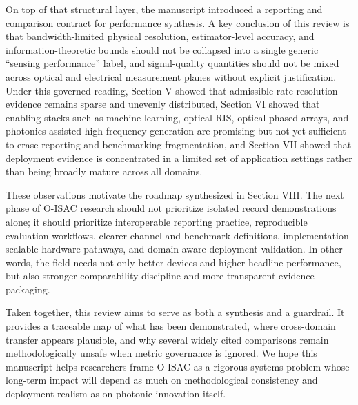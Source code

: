 \documentclass[lettersize,journal]{IEEEtran}
\begin{document}
On top of that structural layer, the manuscript introduced a reporting and comparison contract for performance synthesis. A key conclusion of this review is that bandwidth-limited physical resolution, estimator-level accuracy, and information-theoretic bounds should not be collapsed into a single generic ``sensing performance'' label, and signal-quality quantities should not be mixed across optical and electrical measurement planes without explicit justification. Under this governed reading, Section V showed that admissible rate-resolution evidence remains sparse and unevenly distributed, Section VI showed that enabling stacks such as machine learning, optical RIS, optical phased arrays, and photonics-assisted high-frequency generation are promising but not yet sufficient to erase reporting and benchmarking fragmentation, and Section VII showed that deployment evidence is concentrated in a limited set of application settings rather than being broadly mature across all domains.

These observations motivate the roadmap synthesized in Section VIII. The next phase of O-ISAC research should not prioritize isolated record demonstrations alone; it should prioritize interoperable reporting practice, reproducible evaluation workflows, clearer channel and benchmark definitions, implementation-scalable hardware pathways, and domain-aware deployment validation. In other words, the field needs not only better devices and higher headline performance, but also stronger comparability discipline and more transparent evidence packaging.

Taken together, this review aims to serve as both a synthesis and a guardrail. It provides a traceable map of what has been demonstrated, where cross-domain transfer appears plausible, and why several widely cited comparisons remain methodologically unsafe when metric governance is ignored. We hope this manuscript helps researchers frame O-ISAC as a rigorous systems problem whose long-term impact will depend as much on methodological consistency and deployment realism as on photonic innovation itself.











\newpage

 
\end{document}
